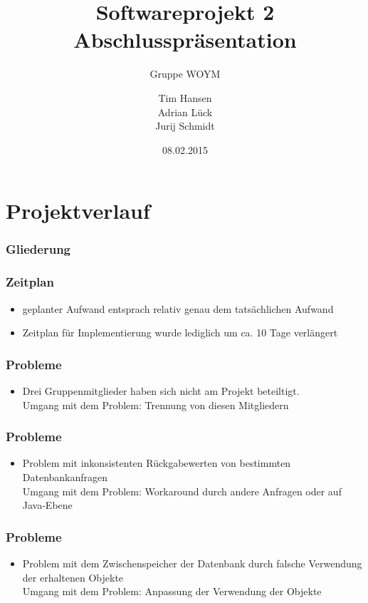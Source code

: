 \documentclass{beamer}
\title{Softwareprojekt 2 Abschlusspräsentation}
\subtitle{Gruppe WOYM}
\date{08.02.2015}
\author{Tim Hansen\\ Adrian Lück\\ Jurij Schmidt}
\institute{Universität Bremen}
\begin{document}
\maketitle

\section{Projektverlauf}
\begin{frame}
\frametitle{Gliederung}
\tableofcontents[currentsection]
\end{frame}

\begin{frame}
\frametitle{Zeitplan}
\begin{itemize}
\item geplanter Aufwand entsprach relativ genau dem tatsächlichen Aufwand
\item Zeitplan für Implementierung wurde lediglich um ca. 10 Tage verlängert
\end{itemize}
\end{frame}

\begin{frame}
\frametitle{Probleme}
\begin{itemize}
\item Drei Gruppenmitglieder haben sich nicht am Projekt beteiltigt.\\ \vspace{10pt}
	{ Umgang mit dem Problem:} Trennung von diesen Mitgliedern
\end{itemize}
\end{frame}

\begin{frame}
\frametitle{Probleme}
\begin{itemize}	
\item Problem mit inkonsistenten Rückgabewerten von bestimmten Datenbankanfragen\\ \vspace{10pt}
	{ Umgang mit dem Problem:} Workaround durch andere Anfragen oder auf Java-Ebene
\end{itemize}
\end{frame}

\begin{frame}
\frametitle{Probleme}
\begin{itemize}	
\item Problem mit dem Zwischenspeicher der Datenbank durch falsche Verwendung der erhaltenen Objekte\\ \vspace{10pt}
{ Umgang mit dem Problem:} Anpassung der Verwendung der Objekte
\end{itemize}
\end{frame}
\end{document}
